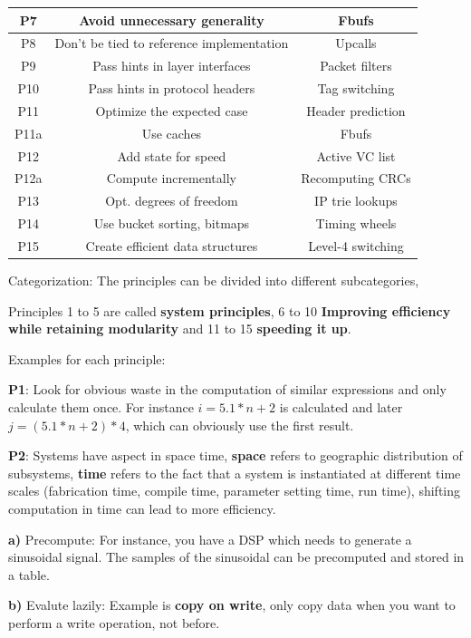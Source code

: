 \begin{tabular}{|c|c|c|}
\hline 
P7 & Avoid unnecessary generality & Fbufs \\ 
\hline 
P8 & Don't be tied to reference implementation & Upcalls \\ 
\hline 
P9 & Pass hints in layer interfaces & Packet filters \\ 
\hline 
P10 & Pass hints in protocol headers & Tag switching \\ 
\hline 
P11 & Optimize the expected case & Header prediction \\ 
P11a & Use caches & Fbufs \\ 
\hline 
P12 & Add state for speed & Active VC list \\ 
P12a & Compute incrementally & Recomputing CRCs \\ 
\hline 
P13 & Opt. degrees of freedom & IP trie lookups \\ 
\hline 
P14 & Use bucket sorting, bitmaps & Timing wheels \\ 
\hline 
P15 & Create efficient data structures & Level-4 switching \\ 
\hline 
\end{tabular} 

Categorization: The principles can be divided into different subcategories,

Principles 1 to 5 are called \textbf{system principles}, 6 to 10 \textbf{Improving efficiency while retaining modularity} and 11 to 15 \textbf{speeding it up}.  

Examples for each principle:

\textbf{P1}: Look for obvious waste in the computation of similar expressions and only calculate them once. For instance $i = 5.1 * n + 2$ is calculated and later $j = (5.1 * n+ 2) *4$, which can obviously use the first result.

\textbf{P2}: Systems have aspect in space time, \textbf{space} refers to geographic distribution of subsystems, \textbf{time} refers to the fact that a system is instantiated at different time scales (fabrication time, compile time, parameter setting time, run time), shifting computation in time can lead to more efficiency.

\textbf{a)} Precompute: For instance, you have a DSP which needs to generate a sinusoidal signal. The samples of the sinusoidal can be precomputed and stored in a table.

\textbf{b)} Evalute lazily: Example is \textbf{copy on write}, only copy data when you want to perform a write operation, not before.

